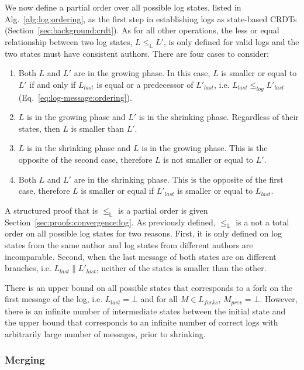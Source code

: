 \documentclass[9pt, oneside]{article}   	%
\begin{document}
We now define a partial order over all possible log states, listed in Alg.~\ref{alg:log:ordering}, as the first step in establishing logs as state-based CRDTs (Section~\ref{sec:background:crdt}). As for all other operations, the less or equal relationship between two log states, $L \leq_\mathds{L} L'$, is only defined for valid logs and the two states must have consistent authors. There are four cases to consider:
\begin{enumerate}
	\item Both $L$ and $L'$ are in the growing phase. In this case, $L$ is smaller or equal to $L'$ if and only if $L_\textit{last}$ is equal or a predecessor of $L'_\textit{last}$, i.e. $L_\textit{last} \leq_\textit{log} L'_\textit{last}$ (Eq.~\ref{eq:log-message:ordering}).

	\item $L$ is in the growing phase and $L'$ is in the shrinking phase. Regardless of their states, then $L$ is smaller than $L'$.

	\item $L$ is in the shrinking phase and $L$ is in the growing phase. This is the opposite of the second case, therefore $L$ is not smaller or equal to $L'$.
	\item Both $L$ and $L'$ are in the shrinking phase. This is the opposite of the first case, therefore $L$ is smaller or equal if $L'_\textit{last}$ is smaller or equal to $L_\textit{last}$. 
\end{enumerate}

A structured proof that is $\leq_\mathds{L}$ is a partial order is given Section~\ref{sec:proofs:convergence:log}. As previously defined, $\leq_\mathds{L}$ is a not a total order on all possible log states for two reasons. First, it is only defined on log states from the same author and log states from different authors are incomparable. Second, when the last message of both states are on different branches, i.e. $L_\textit{last} \parallel L'_\textit{last}$, neither of the states is smaller than the other.

There is an upper bound on all possible states that corresponds to a fork on the first message of the log,  i.e. $L_\textit{last} = \bot$ and for all $M \in L_\textit{forks}$, $M_\textit{prev} = \bot$. However, there is an infinite number of intermediate states between the initial state and the upper bound that corresponds to an infinite number of correct logs with arbitrarily large number of messages, prior to shrinking.

\subsubsection{Merging}
\label{sec:design:log:merging}
\end{document}
